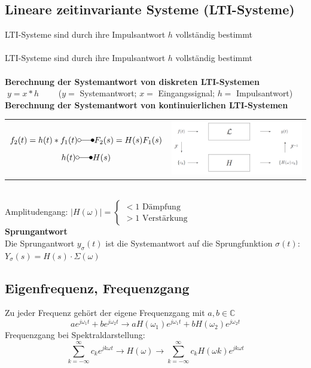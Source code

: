 	\subsection{Lineare zeitinvariante Systeme (LTI-Systeme)}
		LTI-Systeme sind durch ihre Impulsantwort $h$ vollständig bestimmt\\ \\	
		LTI-Systeme sind durch ihre Impulsantwort $h$ vollständig bestimmt\\ \\
		\textbf{Berechnung der Systemantwort von diskreten LTI-Systemen}\\
		$\; y=x*h \qquad$ ($y=$ Systemantwort; $x=$ Eingangssignal; $h=$
		Impulsantwort)\\
		
		\textbf{Berechnung der Systemantwort von kontinuierlichen LTI-Systemen}\\
		\begin{tabular}{ll}
			\parbox{8cm}{
			$$f_2(t) = h(t) * f_1(t) \laplace F_2(s) = H(s) F_1(s)$$
			$$h(t) \laplace H(s)$$}
			& \parbox{4cm}{
			\includegraphics[width=6cm]{./bilder/utf-theorie.png}}\\
		\end{tabular} \\
		Amplitudengang: 		$|H(\omega)| = \begin{cases}
								< 1 \text{ Dämpfung} \\
								> 1 \text{ Verstärkung}
								\end{cases}$	\\
		\textbf{Sprungantwort} \\
		Die Sprungantwort $y_{\sigma}(t)$ ist die Systemantwort auf die
		Sprungfunktion $\sigma(t)$: \\ $Y_{\sigma}(s)=H(s) \cdot \Sigma(\omega)$

	\subsection{Eigenfrequenz, Frequenzgang}
	Zu jeder Frequenz gehört der eigene Frequenzgang mit $a, b \in \mathbb{C}$\\
	$$a e^{j\omega_1 t} + b e^{j\omega_2 t} \rightarrow a H(\omega_1) e^{j\omega_1 t} + b H(\omega_2) e^{j\omega_2 t}$$
	Frequenzgang bei Spektraldarstellung: $$\sum_{k=-\infty}^{\infty} c_k e^{jk\omega t} \rightarrow \boxed{H(\omega)}
	\rightarrow \sum_{k=-\infty}^{\infty} c_k H(\omega k) e^{jk\omega t}$$			
	
